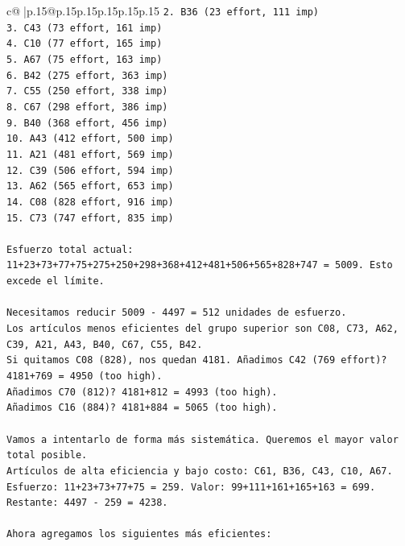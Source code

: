 \documentclass{article}
\begin{document}
{\begin{supertabular}{c@{$\;$}|p{.15\linewidth}@{}p{.15\linewidth}p{.15\linewidth}p{.15\linewidth}p{.15\linewidth}p{.15\linewidth}}
{{{\texttt{2. B36 (23 effort, 111 imp)} \\
\texttt{3. C43 (73 effort, 161 imp)} \\
\texttt{4. C10 (77 effort, 165 imp)} \\
\texttt{5. A67 (75 effort, 163 imp)} \\
\texttt{6. B42 (275 effort, 363 imp)} \\
\texttt{7. C55 (250 effort, 338 imp)} \\
\texttt{8. C67 (298 effort, 386 imp)} \\
\texttt{9. B40 (368 effort, 456 imp)} \\
\texttt{10. A43 (412 effort, 500 imp)} \\
\texttt{11. A21 (481 effort, 569 imp)} \\
\texttt{12. C39 (506 effort, 594 imp)} \\
\texttt{13. A62 (565 effort, 653 imp)} \\
\texttt{14. C08 (828 effort, 916 imp)} \\
\texttt{15. C73 (747 effort, 835 imp)} \\
\\ 
\texttt{Esfuerzo total actual: 11+23+73+77+75+275+250+298+368+412+481+506+565+828+747 = 5009. Esto excede el límite.} \\
\\ 
\texttt{Necesitamos reducir 5009 {-} 4497 = 512 unidades de esfuerzo.} \\
\texttt{Los artículos menos eficientes del grupo superior son C08, C73, A62, C39, A21, A43, B40, C67, C55, B42.} \\
\texttt{Si quitamos C08 (828), nos quedan 4181. Añadimos C42 (769 effort)? 4181+769 = 4950 (too high).} \\
\texttt{Añadimos C70 (812)? 4181+812 = 4993 (too high).} \\
\texttt{Añadimos C16 (884)? 4181+884 = 5065 (too high).} \\
\\ 
\texttt{Vamos a intentarlo de forma más sistemática. Queremos el mayor valor total posible.} \\
\texttt{Artículos de alta eficiencia y bajo costo: C61, B36, C43, C10, A67.} \\
\texttt{Esfuerzo: 11+23+73+77+75 = 259. Valor: 99+111+161+165+163 = 699.} \\
\texttt{Restante: 4497 {-} 259 = 4238.} \\
\\ 
\texttt{Ahora agregamos los siguientes más eficientes:} \\
}}}
\end{supertabular}}
\end{document}
